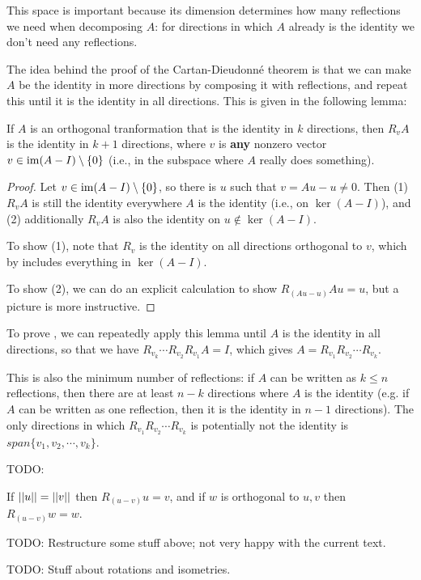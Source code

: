 This space is important because its dimension determines how many reflections we need when decomposing $A$: for directions in which $A$ already is the identity we don't need any reflections.

The idea behind the proof of the Cartan-Dieudonné theorem is that we can make $A$ be the identity in more directions by composing it with reflections, and repeat this until it is the identity in all directions.
This is given in the following lemma:

\begin{lemma}
  If $A$ is an orthogonal tranformation that is the identity in $k$ directions, then $R_v A$ is the identity in $k+1$ directions, where $v$ is \textbf{any} nonzero vector $v \in \operatorname{im}(A - I) \setminus \{ 0 \}$ (i.e., in the subspace where $A$ really does something).
\end{lemma}
\begin{proof}
  Let $v \in \operatorname{im}(A-I) \setminus \{ 0 \}$, so there is $u$ such that $v = Au - u \neq 0$.
  Then (1) $R_v A$ is still the identity everywhere $A$ is the identity (i.e., on $\ker(A - I)$), and (2) additionally $R_v A$ is also the identity on $u \notin \ker(A - I)$.

  To show (1), note that $R_v$ is the identity on all directions orthogonal to $v$, which by  includes everything in $\ker(A - I)$.

  To show (2), we can do an explicit calculation to show $R_{(Au - u)}Au = u$, but a picture is more instructive.
\end{proof}

To prove , we can repeatedly apply this lemma until $A$ is the identity in all directions, so that we have $R_{v_k} \cdots R_{v_2} R_{v_1} A = I$, which gives $A = R_{v_1} R_{v_2} \cdots R_{v_k}$.

This is also the minimum number of reflections: if $A$ can be written as $k \leq n$ reflections, then there are at least $n - k$ directions where $A$ is the identity (e.g. if $A$ can be written as one reflection, then it is the identity in $n - 1$ directions).
The only directions in which $R_{v_1} R_{v_2} \cdots R_{v_k}$ is potentially not the identity is $span \{v_1, v_2, \cdots, v_k\}$.

TODO:

\begin{lemma}
  If $||u|| = ||v||$ then $R_{(u - v)}u = v$, and if $w$ is orthogonal to $u,v$ then $R_{(u-v)}w = w$.
\end{lemma}

TODO:
Restructure some stuff above; not very happy with the current text.

TODO:
Stuff about rotations and isometries.


% 
% 


